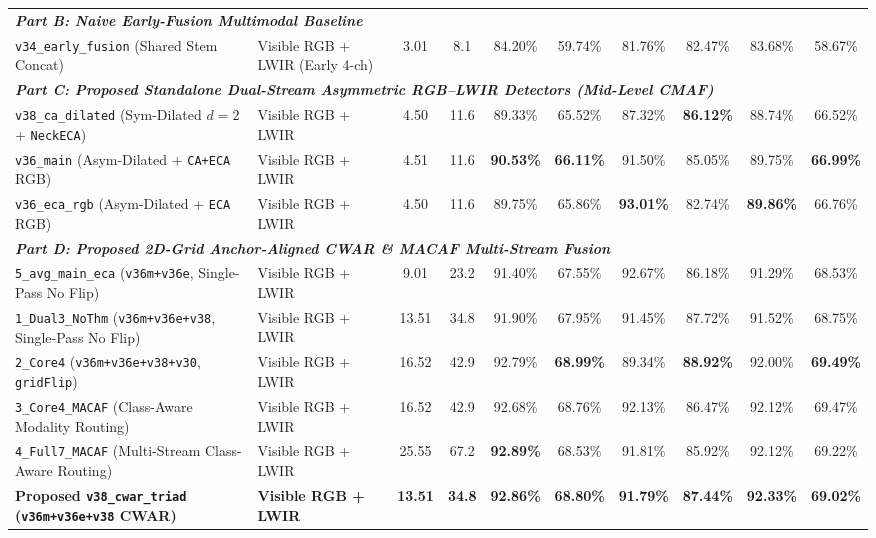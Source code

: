 \documentclass[journal,twoside,web]{ieeecolor}
\begin{document}
\begin{table}[t]
{\begin{tabular}{l l c c c c c c c c}
\midrule
\multicolumn{10}{l}{\textit{\textbf{Part B: Naive Early-Fusion Multimodal Baseline}}} \\
\texttt{v34\_early\_fusion} (Shared Stem Concat) & Visible RGB + LWIR (Early 4-ch) & 3.01  & 8.1  & 84.20\% & 59.74\% & 81.76\% & 82.47\% & 83.68\% & 58.67\% \\
\midrule
\multicolumn{10}{l}{\textit{\textbf{Part C: Proposed Standalone Dual-Stream Asymmetric RGB--LWIR Detectors (Mid-Level CMAF)}}} \\
\texttt{v38\_ca\_dilated} (Sym-Dilated $d=2$ + \texttt{NeckECA}) & Visible RGB + LWIR & 4.50 & 11.6 & 89.33\% & 65.52\% & 87.32\% & \textbf{86.12\%} & 88.74\% & 66.52\% \\
\texttt{v36\_main} (Asym-Dilated + \texttt{CA+ECA} RGB)          & Visible RGB + LWIR & 4.51 & 11.6 & \textbf{90.53\%} & \textbf{66.11\%} & 91.50\% & 85.05\% & 89.75\% & \textbf{66.99\%} \\
\texttt{v36\_eca\_rgb} (Asym-Dilated + \texttt{ECA} RGB)         & Visible RGB + LWIR & 4.50 & 11.6 & 89.75\% & 65.86\% & \textbf{93.01\%} & 82.74\% & \textbf{89.86\%} & 66.76\% \\
\midrule
\multicolumn{10}{l}{\textit{\textbf{Part D: Proposed 2D-Grid Anchor-Aligned CWAR \& MACAF Multi-Stream Fusion}}} \\
\texttt{5\_avg\_main\_eca} (\texttt{v36m+v36e}, Single-Pass No Flip) & Visible RGB + LWIR & 9.01 & 23.2 & 91.40\% & 67.55\% & 92.67\% & 86.18\% & 91.29\% & 68.53\% \\
\texttt{1\_Dual3\_NoThm} (\texttt{v36m+v36e+v38}, Single-Pass No Flip)& Visible RGB + LWIR & 13.51& 34.8 & 91.90\% & 67.95\% & 91.45\% & 87.72\% & 91.52\% & 68.75\% \\
\texttt{2\_Core4} (\texttt{v36m+v36e+v38+v30}, \texttt{gridFlip})    & Visible RGB + LWIR & 16.52& 42.9 & 92.79\% & \textbf{68.99\%} & 89.34\% & \textbf{88.92\%} & 92.00\% & \textbf{69.49\%} \\
\texttt{3\_Core4\_MACAF} (Class-Aware Modality Routing)              & Visible RGB + LWIR & 16.52& 42.9 & 92.68\% & 68.76\% & 92.13\% & 86.47\% & 92.12\% & 69.47\% \\
\texttt{4\_Full7\_MACAF} (Multi-Stream Class-Aware Routing)          & Visible RGB + LWIR & 25.55& 67.2 & \textbf{92.89\%} & 68.53\% & 91.81\% & 85.92\% & 92.12\% & 69.22\% \\
\rowcolor{gray!14}
\textbf{Proposed \texttt{v38\_cwar\_triad} (\texttt{v36m+v36e+v38} CWAR)} & \textbf{Visible RGB + LWIR} & \textbf{13.51} & \textbf{34.8} & \textbf{92.86\%} & \textbf{68.80\%} & \textbf{91.79\%} & \textbf{87.44\%} & \textbf{92.33\%} & \textbf{69.02\%} \\

\end{tabular}}
\end{table}
\end{document}
